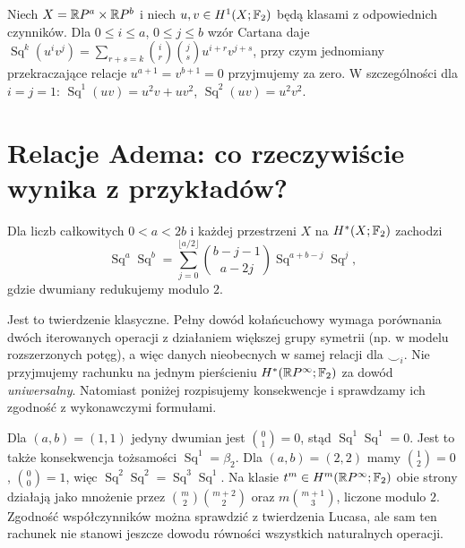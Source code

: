 \begin{przyklad}
Niech $X=\mathbb{R} P^{a}\times\mathbb{R} P^{b}$ i niech
$u,v\in H^1(X;\mathbb{F}_2)$ będą klasami z odpowiednich czynników.
Dla $0\le i\le a$, $0\le j\le b$ wzór Cartana daje
$\operatorname{Sq}^{k}(u^iv^j)=
\sum_{r+s=k}\binom ir\binom js u^{i+r}v^{j+s}$,
przy czym jednomiany przekraczające relacje
$u^{a+1}=v^{b+1}=0$ przyjmujemy za zero.
W szczególności dla $i=j=1$:
$\operatorname{Sq}^1(uv)=u^2v+uv^2$,
$\operatorname{Sq}^2(uv)=u^2v^2$.
\end{przyklad}

\section{Relacje Adema: co rzeczywiście wynika z przykładów?}
\begin{twierdzenie}
\label{thm:adem-v8}
Dla liczb całkowitych $0<a<2b$ i każdej przestrzeni $X$
na $H^*(X;\mathbb{F}_2)$ zachodzi
\[
\operatorname{Sq}^a\operatorname{Sq}^b
 =\sum_{j=0}^{\lfloor a/2\rfloor}
 \binom{b-j-1}{a-2j}
 \operatorname{Sq}^{a+b-j}\operatorname{Sq}^{j},
\]
gdzie dwumiany redukujemy modulo $2$.
\end{twierdzenie}
\begin{uwaga}
Jest to twierdzenie klasyczne. Pełny dowód kołańcuchowy
wymaga porównania dwóch iterowanych operacji z działaniem
większej grupy symetrii (np. w modelu rozszerzonych potęg),
a więc danych nieobecnych w samej relacji dla $\smile_i$.
Nie przyjmujemy rachunku na jednym pierścieniu
$H^*(\mathbb{R} P^\infty;\mathbb{F}_2)$ za dowód \emph{uniwersalny}.
Natomiast poniżej rozpisujemy konsekwencje i sprawdzamy ich
zgodność z wykonawczymi formułami.
\end{uwaga}
\begin{przyklad}
Dla $(a,b)=(1,1)$ jedyny dwumian jest
$\binom{0}{1}=0$, stąd
$\operatorname{Sq}^1\operatorname{Sq}^1=0$.
Jest to także konsekwencja tożsamości
$\operatorname{Sq}^1=\beta_2$.
Dla $(a,b)=(2,2)$ mamy
$\binom{1}{2}=0$, $\binom{0}{0}=1$, więc
$\operatorname{Sq}^2\operatorname{Sq}^2=
\operatorname{Sq}^3\operatorname{Sq}^1$.
Na klasie $t^m\in H^m(\mathbb{R} P^\infty;\mathbb{F}_2)$
obie strony działają jako mnożenie przez
$\binom m2\binom{m+2}2$ oraz
$m\binom{m+1}3$, liczone modulo $2$.
Zgodność współczynników można sprawdzić z twierdzenia Lucasa,
ale sam ten rachunek nie stanowi jeszcze dowodu
równości wszystkich naturalnych operacji.
\end{przyklad}

